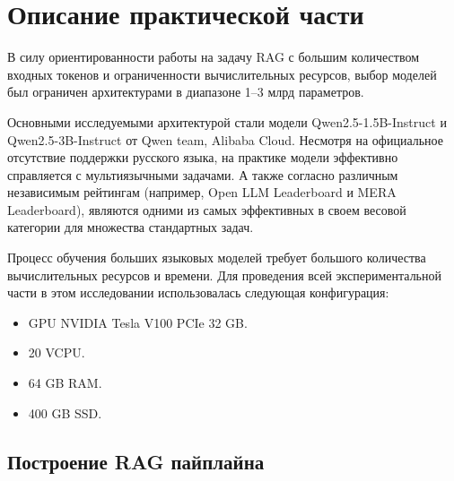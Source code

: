 \section{Описание практической части}
\label{Practical} 

В силу ориентированности работы на задачу RAG с большим количеством входных токенов и ограниченности вычислительных ресурсов, выбор моделей был ограничен архитектурами в диапазоне 1–3 млрд параметров.

Основными исследуемыми архитектурой стали модели Qwen2.5-1.5B-Instruct и Qwen2.5-3B-Instruct от Qwen team, Alibaba Cloud. Несмотря на официальное отсутствие поддержки русского языка, на практике модели эффективно справляется с мультиязычными задачами. А также согласно различным независимым рейтингам (например, Open LLM Leaderboard и MERA Leaderboard), являются одними из самых эффективных в своем весовой категории для множества стандартных задач.



Процесс обучения больших языковых моделей требует большого количества вычислительных ресурсов и времени. Для проведения всей экспериментальной части в этом исследовании использовалась следующая конфигурация:
\begin{itemize}
    \item GPU NVIDIA Tesla V100 PCIe 32 GB.

    \item 20 VCPU.

    \item 64 GB RAM.

    \item 400 GB SSD.
\end{itemize}



\subsection{Построение RAG пайплайна} 
\label{subsec:rag_pipeline} 


